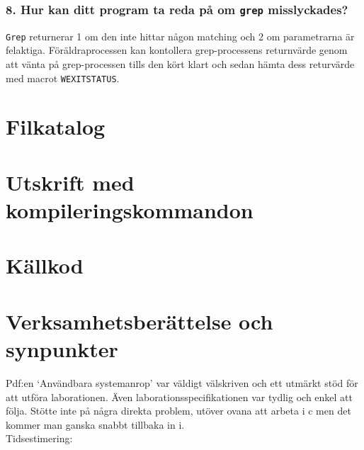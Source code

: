\documentclass[a4paper]{article}
\begin{document}
\subsubsection*{8. Hur kan ditt program ta reda på om \texttt{grep} misslyckades?}
\texttt{Grep} returnerar 1 om den inte hittar någon matching och 2 om parametrarna är felaktiga. Föräldraprocessen kan kontollera grep-processens returnvärde genom att vänta på grep-processen tills den kört klart och sedan hämta dess returvärde med macrot \texttt{WEXITSTATUS}.

\section*{Filkatalog}

\section*{Utskrift med kompileringskommandon}


\section*{Källkod}


\section*{Verksamhetsberättelse och synpunkter}
Pdf:en ‘Användbara systemanrop’ var väldigt välskriven och ett utmärkt stöd för att utföra laborationen. Även laborationsspecifikationen var tydlig och enkel att följa. Stötte inte på några direkta problem, utöver ovana att arbeta i c men det kommer man ganska snabbt tillbaka in i.
\\
Tidsestimering: 
\end{document}
